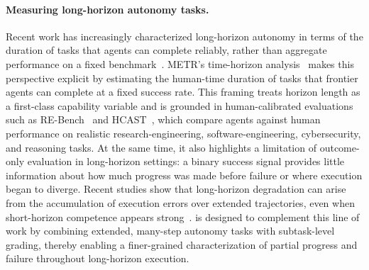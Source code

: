 \paragraph{Measuring long-horizon autonomy tasks.}
Recent work has increasingly characterized long-horizon autonomy in terms of the duration of tasks that agents can complete reliably, rather than aggregate performance on a fixed benchmark~\cite{kwa2025measuring,wijk2024re}.
%
METR's time-horizon analysis~\cite{kwa2025measuring} makes this perspective explicit by estimating the human-time duration of tasks that frontier agents can complete at a fixed success rate.
%
This framing treats horizon length as a first-class capability variable and is grounded in human-calibrated evaluations such as RE-Bench~\cite{wijk2024re} and HCAST~\cite{rein2025hcast}, which compare agents against human performance on realistic research-engineering, software-engineering, cybersecurity, and reasoning tasks.
%
At the same time, it also highlights a limitation of outcome-only evaluation in long-horizon settings: a binary success signal provides little information about how much progress was made before failure or where execution began to diverge.
%
Recent studies show that long-horizon degradation can arise from the accumulation of execution errors over extended trajectories, even when short-horizon competence appears strong~\cite{sinha2025illusion}.
%
\ours{} is designed to complement this line of work by combining extended, many-step autonomy tasks with subtask-level grading, thereby enabling a finer-grained characterization of partial progress and failure throughout long-horizon execution.






